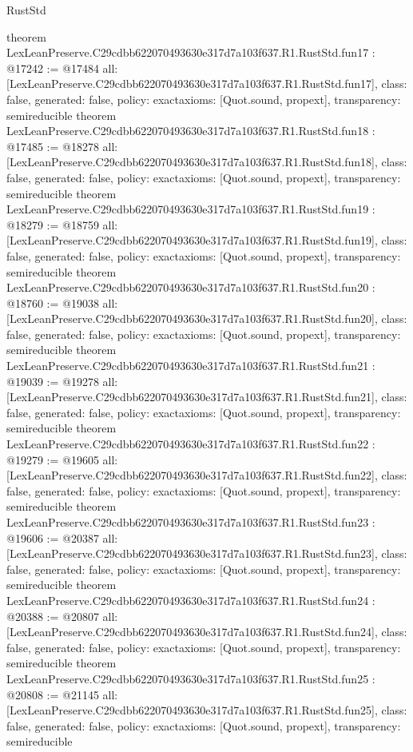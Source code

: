 \begin{lexlean}{RustStd}
\begin{coremodule}
{}
theorem LexLeanPreserve.C29cdbb622070493630e317d7a103f637.R1.RustStd.fun17 : @17242 := @17484 {
  all: [LexLeanPreserve.C29cdbb622070493630e317d7a103f637.R1.RustStd.fun17],
  class: false,
  generated: false,
  policy: exact{axioms: [Quot.sound, propext]},
  transparency: semireducible
}
theorem LexLeanPreserve.C29cdbb622070493630e317d7a103f637.R1.RustStd.fun18 : @17485 := @18278 {
  all: [LexLeanPreserve.C29cdbb622070493630e317d7a103f637.R1.RustStd.fun18],
  class: false,
  generated: false,
  policy: exact{axioms: [Quot.sound, propext]},
  transparency: semireducible
}
theorem LexLeanPreserve.C29cdbb622070493630e317d7a103f637.R1.RustStd.fun19 : @18279 := @18759 {
  all: [LexLeanPreserve.C29cdbb622070493630e317d7a103f637.R1.RustStd.fun19],
  class: false,
  generated: false,
  policy: exact{axioms: [Quot.sound, propext]},
  transparency: semireducible
}
theorem LexLeanPreserve.C29cdbb622070493630e317d7a103f637.R1.RustStd.fun20 : @18760 := @19038 {
  all: [LexLeanPreserve.C29cdbb622070493630e317d7a103f637.R1.RustStd.fun20],
  class: false,
  generated: false,
  policy: exact{axioms: [Quot.sound, propext]},
  transparency: semireducible
}
theorem LexLeanPreserve.C29cdbb622070493630e317d7a103f637.R1.RustStd.fun21 : @19039 := @19278 {
  all: [LexLeanPreserve.C29cdbb622070493630e317d7a103f637.R1.RustStd.fun21],
  class: false,
  generated: false,
  policy: exact{axioms: [Quot.sound, propext]},
  transparency: semireducible
}
theorem LexLeanPreserve.C29cdbb622070493630e317d7a103f637.R1.RustStd.fun22 : @19279 := @19605 {
  all: [LexLeanPreserve.C29cdbb622070493630e317d7a103f637.R1.RustStd.fun22],
  class: false,
  generated: false,
  policy: exact{axioms: [Quot.sound, propext]},
  transparency: semireducible
}
theorem LexLeanPreserve.C29cdbb622070493630e317d7a103f637.R1.RustStd.fun23 : @19606 := @20387 {
  all: [LexLeanPreserve.C29cdbb622070493630e317d7a103f637.R1.RustStd.fun23],
  class: false,
  generated: false,
  policy: exact{axioms: [Quot.sound, propext]},
  transparency: semireducible
}
theorem LexLeanPreserve.C29cdbb622070493630e317d7a103f637.R1.RustStd.fun24 : @20388 := @20807 {
  all: [LexLeanPreserve.C29cdbb622070493630e317d7a103f637.R1.RustStd.fun24],
  class: false,
  generated: false,
  policy: exact{axioms: [Quot.sound, propext]},
  transparency: semireducible
}
theorem LexLeanPreserve.C29cdbb622070493630e317d7a103f637.R1.RustStd.fun25 : @20808 := @21145 {
  all: [LexLeanPreserve.C29cdbb622070493630e317d7a103f637.R1.RustStd.fun25],
  class: false,
  generated: false,
  policy: exact{axioms: [Quot.sound, propext]},
  transparency: semireducible
}
\end{coremodule}
\end{lexlean}
